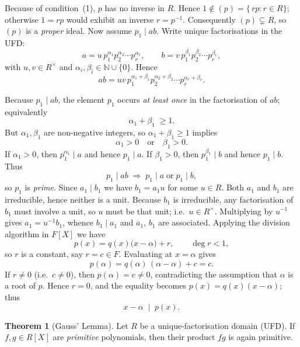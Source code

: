 \documentclass[12pt]{article}
\theoremstyle{definition} %
\newtheorem{theorem}{Theorem}
\theoremstyle{plain} %
\begin{document}
Because of condition~(1), $p$ has no inverse in $R$.
Hence $1\notin(p)=\{\,rp : r\in R\}$; otherwise $1=rp$ would exhibit an
inverse $r=p^{-1}$.
Consequently $(p)\subsetneq R$, so $(p)$ is a \emph{proper} ideal.
\medskip
\noindent
Now assume $p_{1}\mid ab$.
Write unique factorisations in the UFD:
\[
  a = u\,p_{1}^{\alpha_{1}}p_{2}^{\alpha_{2}}\cdots p_{r}^{\alpha_{r}},
  \qquad
  b = v\,p_{1}^{\beta_{1}}p_{2}^{\beta_{2}}\cdots p_{r}^{\beta_{r}},
\]
with $u,v\in R^{\times}$ and $\alpha_i,\beta_i\in\mathbb N\cup\{0\}$.
Hence
\[
  ab = uv\,
       p_{1}^{\alpha_{1}+\beta_{1}}
       p_{2}^{\alpha_{2}+\beta_{2}}\cdots
       p_{r}^{\alpha_{r}+\beta_{r}}.
\]

Because $p_{1}\mid ab$, the element $p_{1}$ occurs \emph{at least once}
in the factorisation of $ab$; equivalently
\[
  \alpha_{1}+\beta_{1} \;\ge 1.
\]
But $\alpha_{1},\beta_{1}$ are non-negative integers, so
$\alpha_{1}+\beta_{1}\ge1$ implies
\[
  \alpha_{1}>0 \quad\text{or}\quad \beta_{1}>0.
\]
If $\alpha_{1}>0$, then $p_{1}^{\alpha_{1}}\mid a$ and hence $p_{1}\mid a$.
If $\beta_{1}>0$, then $p_{1}^{\beta_{1}}\mid b$ and hence $p_{1}\mid b$.
Thus
\[
  p_{1}\mid ab
  \;\Longrightarrow\;
  p_{1}\mid a \;\text{or}\; p_{1}\mid b,
\]
so $p_{1}$ is \emph{prime}.
Since $a_{1}\mid b_{1}$ we have $b_{1}=a_{1}u$ for some $u\in R$.
Both $a_{1}$ and $b_{1}$ are irreducible, hence neither is a unit.
Because $b_{1}$ is irreducible, any factorisation of $b_{1}$ must involve
a unit, so $u$ must be that unit; i.e.\ $u\in R^{\times}$.
Multiplying by $u^{-1}$ gives $a_{1}=u^{-1}b_{1}$, whence
$b_{1}\mid a_{1}$ and $a_{1}$, $b_{1}$ are associated.
Applying the division algorithm in $F[X]$ we have
\[
  p(x)=q(x)\bigl(x-\alpha\bigr)+r,
  \qquad \deg r<1,
\]
so $r$ is a constant, say $r=c\in F$.
Evaluating at $x=\alpha$ gives
\[
  p(\alpha)=q(\alpha)\,(\alpha-\alpha)+c = c.
\]
If $r\neq0$ (i.e.\ $c\neq0$), then $p(\alpha)=c\neq0$, contradicting the
assumption that $\alpha$ is a root of $p$.
Hence $r=0$, and the equality becomes $p(x)=q(x)(x-\alpha)$; thus
\[
  x-\alpha \;\mid\; p(x).
\]
\begin{theorem}[Gauss' Lemma]\label{thm:GaussLemmaUFD}
  Let $R$ be a unique-factorisation domain (UFD).  
  If $f,g\in R[X]$ are \emph{primitive} polynomials, then their product
  $fg$ is again primitive.
  \end{theorem}
  
\end{document}
